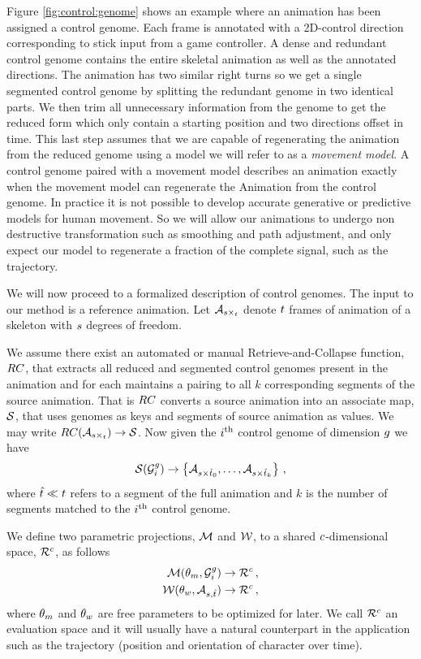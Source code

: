 Figure \ref{fig:control:genome} shows an example where an animation has been assigned a control genome. Each frame is annotated with a 2D-control direction corresponding to stick input from a game controller. A dense and redundant control genome contains the entire skeletal animation as well as the annotated directions. The animation has two similar right turns so we get a single segmented control genome by splitting the redundant genome in two identical parts. We then trim all unnecessary information from the genome to get the reduced form which only contain a starting position and two directions offset in time. This last step assumes that we are capable of regenerating the animation from the reduced genome using a model we will refer to as a \textit{movement model}. A control genome paired with a movement model describes an animation exactly when the movement model can regenerate the Animation from the control genome.  In practice it is not possible to develop accurate generative or predictive models for human movement. So we will allow our animations to undergo non destructive transformation such as smoothing and path adjustment, and only expect our model to regenerate a fraction of the complete signal, such as the trajectory. 

We will now proceed to a formalized description of control genomes. The input to our method is a reference animation. Let $\mathcal{A}_{s\times_t}$ denote $t$ frames of animation of a skeleton with $s$ degrees of freedom. 

We assume there exist an automated or manual Retrieve-and-Collapse function, ${RC}$,  that extracts all reduced and segmented control genomes present in the animation and for each maintains a pairing to all $k$ corresponding segments of the source animation. That is ${RC}$ converts a source animation into an associate map, $\mathcal{S}$, that uses genomes as keys and segments of source animation as values. We may write ${RC}(\mathcal{A}_{s\times_t}) \rightarrow \mathcal{S}$. Now given the $i ^{\text{th}}$ control genome of dimension $g$ we have
\begin{equation}
 \mathcal{S}(\mathcal{G}^g_i) \rightarrow \left\{\mathcal{A}_{s\times{\hat{t}}_0},\ldots,\mathcal{A}_{s\times{\hat{t}}_k}\right\}   \,,
\end{equation}
where ${\hat{t}}\ll t$ refers to a segment of the full animation and $k$ is the number of segments matched to the $i ^{\text{th}}$ control genome.

We define two parametric projections, $\mathcal{M}$ and $\mathcal{W}$, to a shared $c$-dimensional space, $\mathcal{R}^{c}$, as follows
\begin{align}
\mathcal{M}(\theta_{m},\mathcal{G}_i^{g}) 
&\rightarrow 
\mathcal{R}^{c}    \,,
\\
\mathcal{W}(\theta_{w},\mathcal{A}_{s,{\hat{t}}})
&\rightarrow
\mathcal{R}^{c} \,,
\end{align}
where $\theta_{m}$ and $\theta_{w}$ are free parameters to be optimized for later. We call $\mathcal{R}^{c}$ an evaluation space and it will usually have a natural counterpart in the application such as the trajectory (position and orientation of character over time).

